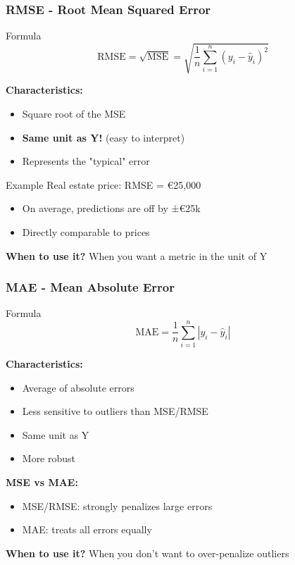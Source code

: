 \documentclass{beamer}
\begin{document}
\begin{frame}
\frametitle{RMSE - Root Mean Squared Error}
\begin{block}{Formula}
$$\text{RMSE} = \sqrt{\text{MSE}} = \sqrt{\frac{1}{n}\sum_{i=1}^{n}(y_i - \hat{y}_i)^2}$$
\end{block}

\textbf{Characteristics:}
\begin{itemize}
    \item Square root of the MSE
    \item \textbf{Same unit as Y!} (easy to interpret)
    \item Represents the "typical" error
\end{itemize}

\vspace{0.5em}
\begin{exampleblock}{Example}
Real estate price: RMSE = €25,000
\begin{itemize}
    \item On average, predictions are off by ±€25k
    \item Directly comparable to prices
\end{itemize}
\end{exampleblock}

\textbf{When to use it?} When you want a metric in the unit of Y
\end{frame}

\begin{frame}
\frametitle{MAE - Mean Absolute Error}
\begin{block}{Formula}
$$\text{MAE} = \frac{1}{n}\sum_{i=1}^{n}|y_i - \hat{y}_i|$$
\end{block}

\textbf{Characteristics:}
\begin{itemize}
    \item Average of absolute errors
    \item Less sensitive to outliers than MSE/RMSE
    \item Same unit as Y
    \item More robust
\end{itemize}

\vspace{0.5em}
\textbf{MSE vs MAE:}
\begin{itemize}
    \item MSE/RMSE: strongly penalizes large errors
    \item MAE: treats all errors equally
\end{itemize}

\vspace{0.5em}
\textbf{When to use it?} When you don't want to over-penalize outliers
\end{frame}
\end{document}
